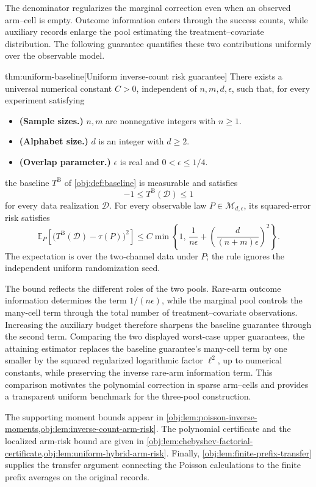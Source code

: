 The denominator regularizes the marginal correction even when an observed arm--cell is empty. Outcome information enters through the success counts, while auxiliary records enlarge the pool estimating the treatment--covariate distribution. The following guarantee quantifies these two contributions uniformly over the observable model.

\begin{theoremv}{thm:uniform-baseline}[Uniform inverse-count risk guarantee]
There exists a universal numerical constant \(C>0\), independent of \(n,m,d,\epsilon\), such that, for every experiment satisfying
\begin{itemize}
\item \textbf{(Sample sizes.)} \(n,m\) are nonnegative integers with \(n\ge 1\).
\item \textbf{(Alphabet size.)} \(d\) is an integer with \(d\ge 2\).
\item \textbf{(Overlap parameter.)} \(\epsilon\) is real and \(0<\epsilon\le 1/4\).
\end{itemize}
the baseline \(T^{\mathrm B}\) of \cref{obj:def:baseline} is measurable and satisfies
\[
-1\le T^{\mathrm B}(\mathcal D)\le 1
\]
for every data realization \(\mathcal D\). For every observable law \(P\in\mathcal M_{d,\epsilon}\), its squared-error risk satisfies
\[
\mathbb E_P\!\left[
  \bigl(T^{\mathrm B}(\mathcal D)-\tau(P)\bigr)^2
\right]
\le
C\min\!\left\{
1,\,
\frac{1}{n\epsilon}
+
\left(\frac{d}{(n+m)\epsilon}\right)^2
\right\}.
\]
The expectation is over the two-channel data under \(P\); the rule ignores the independent uniform randomization seed.
\end{theoremv}

The bound reflects the different roles of the two pools. Rare-arm outcome information determines the term \(1/(n\epsilon)\), while the marginal pool controls the many-cell term through the total number of treatment--covariate observations. Increasing the auxiliary budget therefore sharpens the baseline guarantee through the second term. Comparing the two displayed worst-case upper guarantees, the attaining estimator replaces the baseline guarantee's many-cell term by one smaller by the squared regularized logarithmic factor \(\ell^2\), up to numerical constants, while preserving the inverse rare-arm information term. This comparison motivates the polynomial correction in sparse arm--cells and provides a transparent uniform benchmark for the three-pool construction.

The supporting moment bounds appear in \cref{obj:lem:poisson-inverse-moments,obj:lem:inverse-count-arm-risk}. The polynomial certificate and the localized arm-risk bound are given in \cref{obj:lem:chebyshev-factorial-certificate,obj:lem:uniform-hybrid-arm-risk}. Finally, \cref{obj:lem:finite-prefix-transfer} supplies the transfer argument connecting the Poisson calculations to the finite prefix averages on the original records.
